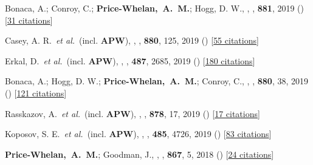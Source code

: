 \item[{\color{deemph}\scriptsize53}]Bonaca, A.; Conroy, C.; \textbf{Price-Whelan,~A.~M.}; Hogg, D. W., , \apj, \textbf{881}, 2019 () [\href{http://adsabs.harvard.edu/abs/2019ApJ...881L..37B}{31 citations}]

\item[{\color{deemph}\scriptsize52}]Casey, A. R.~\textit{et al.}~(incl. \textbf{APW}), , \apj, \textbf{880}, 125, 2019 () [\href{http://adsabs.harvard.edu/abs/2019ApJ...880..125C}{55 citations}]

\item[{\color{deemph}\scriptsize51}]Erkal, D.~\textit{et al.}~(incl. \textbf{APW}), , \mnras, \textbf{487}, 2685, 2019 () [\href{http://adsabs.harvard.edu/abs/2019MNRAS.487.2685E}{180 citations}]

\item[{\color{deemph}\scriptsize50}]Bonaca, A.; Hogg, D. W.; \textbf{Price-Whelan,~A.~M.}; Conroy, C., , \apj, \textbf{880}, 38, 2019 () [\href{http://adsabs.harvard.edu/abs/2019ApJ...880...38B}{121 citations}]

\item[{\color{deemph}\scriptsize49}]Rasskazov, A.~\textit{et al.}~(incl. \textbf{APW}), , \apj, \textbf{878}, 17, 2019 () [\href{http://adsabs.harvard.edu/abs/2019ApJ...878...17R}{17 citations}]

\item[{\color{deemph}\scriptsize48}]Koposov, S. E.~\textit{et al.}~(incl. \textbf{APW}), , \mnras, \textbf{485}, 4726, 2019 () [\href{http://adsabs.harvard.edu/abs/2019MNRAS.485.4726K}{83 citations}]

\item[{\color{deemph}\scriptsize47}]\textbf{Price-Whelan,~A.~M.}; Goodman, J., , \apj, \textbf{867}, 5, 2018 () [\href{http://adsabs.harvard.edu/abs/2018ApJ...867....5P}{24 citations}]

